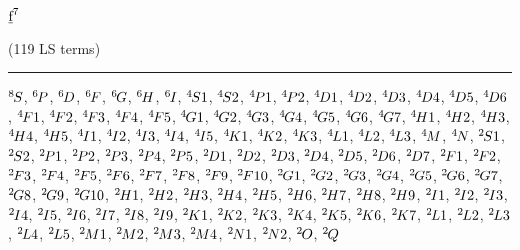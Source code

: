 \begin{mdframed}
\begin{center}
$\underbar{$\text{f}$}^{7}$

(119 LS terms)
\vspace{0.25cm}
\hrule
\vspace{0.25cm}

${}^{8}{\kern-0.1em}{S}$, ${}^{6}{\kern-0.1em}{P}$, ${}^{6}{\kern-0.1em}{D}$, ${}^{6}{\kern-0.1em}{F}$, ${}^{6}{\kern-0.1em}{G}$, ${}^{6}{\kern-0.1em}{H}$, ${}^{6}{\kern-0.1em}{I}$, ${}^{4}{\kern-0.1em}{S1}$, ${}^{4}{\kern-0.1em}{S2}$, ${}^{4}{\kern-0.1em}{P1}$, ${}^{4}{\kern-0.1em}{P2}$, ${}^{4}{\kern-0.1em}{D1}$, ${}^{4}{\kern-0.1em}{D2}$, ${}^{4}{\kern-0.1em}{D3}$, ${}^{4}{\kern-0.1em}{D4}$, ${}^{4}{\kern-0.1em}{D5}$, ${}^{4}{\kern-0.1em}{D6}$, ${}^{4}{\kern-0.1em}{F1}$, ${}^{4}{\kern-0.1em}{F2}$, ${}^{4}{\kern-0.1em}{F3}$, ${}^{4}{\kern-0.1em}{F4}$, ${}^{4}{\kern-0.1em}{F5}$, ${}^{4}{\kern-0.1em}{G1}$, ${}^{4}{\kern-0.1em}{G2}$, ${}^{4}{\kern-0.1em}{G3}$, ${}^{4}{\kern-0.1em}{G4}$, ${}^{4}{\kern-0.1em}{G5}$, ${}^{4}{\kern-0.1em}{G6}$, ${}^{4}{\kern-0.1em}{G7}$, ${}^{4}{\kern-0.1em}{H1}$, ${}^{4}{\kern-0.1em}{H2}$, ${}^{4}{\kern-0.1em}{H3}$, ${}^{4}{\kern-0.1em}{H4}$, ${}^{4}{\kern-0.1em}{H5}$, ${}^{4}{\kern-0.1em}{I1}$, ${}^{4}{\kern-0.1em}{I2}$, ${}^{4}{\kern-0.1em}{I3}$, ${}^{4}{\kern-0.1em}{I4}$, ${}^{4}{\kern-0.1em}{I5}$, ${}^{4}{\kern-0.1em}{K1}$, ${}^{4}{\kern-0.1em}{K2}$, ${}^{4}{\kern-0.1em}{K3}$, ${}^{4}{\kern-0.1em}{L1}$, ${}^{4}{\kern-0.1em}{L2}$, ${}^{4}{\kern-0.1em}{L3}$, ${}^{4}{\kern-0.1em}{M}$, ${}^{4}{\kern-0.1em}{N}$, ${}^{2}{\kern-0.1em}{S1}$, ${}^{2}{\kern-0.1em}{S2}$, ${}^{2}{\kern-0.1em}{P1}$, ${}^{2}{\kern-0.1em}{P2}$, ${}^{2}{\kern-0.1em}{P3}$, ${}^{2}{\kern-0.1em}{P4}$, ${}^{2}{\kern-0.1em}{P5}$, ${}^{2}{\kern-0.1em}{D1}$, ${}^{2}{\kern-0.1em}{D2}$, ${}^{2}{\kern-0.1em}{D3}$, ${}^{2}{\kern-0.1em}{D4}$, ${}^{2}{\kern-0.1em}{D5}$, ${}^{2}{\kern-0.1em}{D6}$, ${}^{2}{\kern-0.1em}{D7}$, ${}^{2}{\kern-0.1em}{F1}$, ${}^{2}{\kern-0.1em}{F2}$, ${}^{2}{\kern-0.1em}{F3}$, ${}^{2}{\kern-0.1em}{F4}$, ${}^{2}{\kern-0.1em}{F5}$, ${}^{2}{\kern-0.1em}{F6}$, ${}^{2}{\kern-0.1em}{F7}$, ${}^{2}{\kern-0.1em}{F8}$, ${}^{2}{\kern-0.1em}{F9}$, ${}^{2}{\kern-0.1em}{F10}$, ${}^{2}{\kern-0.1em}{G1}$, ${}^{2}{\kern-0.1em}{G2}$, ${}^{2}{\kern-0.1em}{G3}$, ${}^{2}{\kern-0.1em}{G4}$, ${}^{2}{\kern-0.1em}{G5}$, ${}^{2}{\kern-0.1em}{G6}$, ${}^{2}{\kern-0.1em}{G7}$, ${}^{2}{\kern-0.1em}{G8}$, ${}^{2}{\kern-0.1em}{G9}$, ${}^{2}{\kern-0.1em}{G10}$, ${}^{2}{\kern-0.1em}{H1}$, ${}^{2}{\kern-0.1em}{H2}$, ${}^{2}{\kern-0.1em}{H3}$, ${}^{2}{\kern-0.1em}{H4}$, ${}^{2}{\kern-0.1em}{H5}$, ${}^{2}{\kern-0.1em}{H6}$, ${}^{2}{\kern-0.1em}{H7}$, ${}^{2}{\kern-0.1em}{H8}$, ${}^{2}{\kern-0.1em}{H9}$, ${}^{2}{\kern-0.1em}{I1}$, ${}^{2}{\kern-0.1em}{I2}$, ${}^{2}{\kern-0.1em}{I3}$, ${}^{2}{\kern-0.1em}{I4}$, ${}^{2}{\kern-0.1em}{I5}$, ${}^{2}{\kern-0.1em}{I6}$, ${}^{2}{\kern-0.1em}{I7}$, ${}^{2}{\kern-0.1em}{I8}$, ${}^{2}{\kern-0.1em}{I9}$, ${}^{2}{\kern-0.1em}{K1}$, ${}^{2}{\kern-0.1em}{K2}$, ${}^{2}{\kern-0.1em}{K3}$, ${}^{2}{\kern-0.1em}{K4}$, ${}^{2}{\kern-0.1em}{K5}$, ${}^{2}{\kern-0.1em}{K6}$, ${}^{2}{\kern-0.1em}{K7}$, ${}^{2}{\kern-0.1em}{L1}$, ${}^{2}{\kern-0.1em}{L2}$, ${}^{2}{\kern-0.1em}{L3}$, ${}^{2}{\kern-0.1em}{L4}$, ${}^{2}{\kern-0.1em}{L5}$, ${}^{2}{\kern-0.1em}{M1}$, ${}^{2}{\kern-0.1em}{M2}$, ${}^{2}{\kern-0.1em}{M3}$, ${}^{2}{\kern-0.1em}{M4}$, ${}^{2}{\kern-0.1em}{N1}$, ${}^{2}{\kern-0.1em}{N2}$, ${}^{2}{\kern-0.1em}{O}$, ${}^{2}{\kern-0.1em}{Q}$
\end{center}
\end{mdframed}

